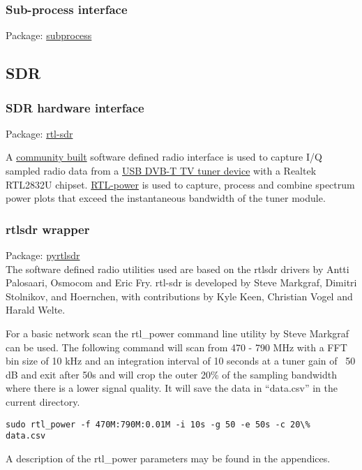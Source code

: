 \subsubsection{Sub-process interface}
Package:	\href{https://docs.python.org/2/library/subprocess.html}{subprocess}\\

\subsection{SDR}
\subsubsection{SDR hardware interface}
Package:	\href{http://sdr.osmocom.org/trac/wiki/rtl-sdr}{rtl-sdr}

A \href{http://sdr.osmocom.org/trac/wiki/rtl-sdr#Buildingthesoftware}{community built} software defined radio interface is used to capture I/Q sampled radio data from a \href{http://www.rtl-sdr.com/buy-rtl-sdr-dvb-t-dongles/}{ USB DVB-T TV tuner device} with a Realtek RTL2832U chipset. \href{http://kmkeen.com/rtl-power/}{RTL-power} is used to capture, process and combine spectrum power plots that exceed the instantaneous bandwidth of the tuner module.

\subsubsection{rtlsdr wrapper}
Package:	\href{https://github.com/roger-/pyrtlsdr}{pyrtlsdr}\\
The software defined radio utilities used are based on the rtlsdr drivers by Antti Palosaari, Osmocom and Eric Fry. rtl-sdr is developed by Steve Markgraf, Dimitri Stolnikov, and Hoernchen, with contributions by Kyle Keen, Christian Vogel and Harald Welte.

For a basic network scan the rtl\_power command line utility by Steve Markgraf can be used. The following command will scan from 470 - 790 MHz with a FFT bin size of 10 kHz and an integration interval of 10 seconds at a tuner gain of ~50 dB and exit after 50s and will crop the outer 20\% of the sampling bandwidth where there is a lower signal quality. It will save the data in “data.csv” in the current directory.
\begin{lstlisting}
sudo rtl_power -f 470M:790M:0.01M -i 10s -g 50 -e 50s -c 20\%  data.csv
\end{lstlisting}

A description of the rtl\_power parameters may be found in the appendices.

